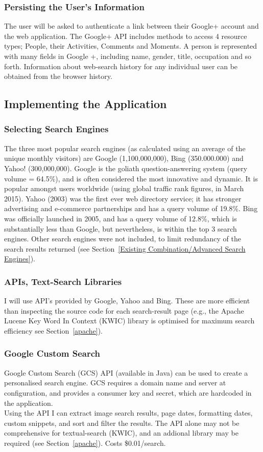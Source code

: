 \documentclass[a4paper, 11pt]{article}
\begin{document}
\subsubsection{Persisting the User's Information}
The user will be asked to authenticate a link between their Google+ account and the web application. The Google+ API includes methods to access 4 resource  types; People, their Activities, Comments and Moments. A person is represented with many fields in Google +, including name, gender, title, occupation and so forth. Information about web-search history for any individual user can be obtained from the browser history. 

\subsection{Implementing the Application}\label{api}
\subsubsection{Selecting Search Engines} 
The three most popular search engines (as calculated using an average of the unique monthly visitors) are Google (1,100,000,000), Bing (350.000.000) and Yahoo! (300,000,000)\cite{ebiz}. Google is the goliath question-answering system (query volume = 64.5\%)\cite{adam}, and is often considered the most innovative and dynamic. It is popular amongst users worldwide (using global traffic rank figures, in March 2015). Yahoo (2003) was the first ever web directory service; it has stronger advertising and e-commerce partnerships and has a query volume of 19.8\%. Bing was officially launched in 2005, and has a query volume of 12.8\%, which is substantially less than Google, but nevertheless, is within the top 3 search engines. Other search engines were not included, to limit redundancy of the search results returned (see Section~\ref{Existing Combination/Advanced Search Engines}). 

\subsubsection{APIs, Text-Search Libraries}
I will use API’s provided by Google, Yahoo and Bing. These are more efficient than inspecting the source code for each search-result page (e.g., the Apache Lucene Key Word In Context (KWIC) library is optimised for maximum search efficiency see Section~\ref{apache}). 

\subsubsection{Google Custom Search}
Google Custom Search (GCS) API (available in Java) can be used to create a personalised search engine. GCS requires a domain name and server at configuration, and provides a consumer key and secret, which are hardcoded in the application.\\
Using the API I can extract image search results, page dates, formatting dates, custom snippets, and sort and filter the results. The API alone may not be comprehensive for textual-search (KWIC), and an addional library may be required (see Section~\ref{apache}). Costs \$0.01/search.
\end{document}
